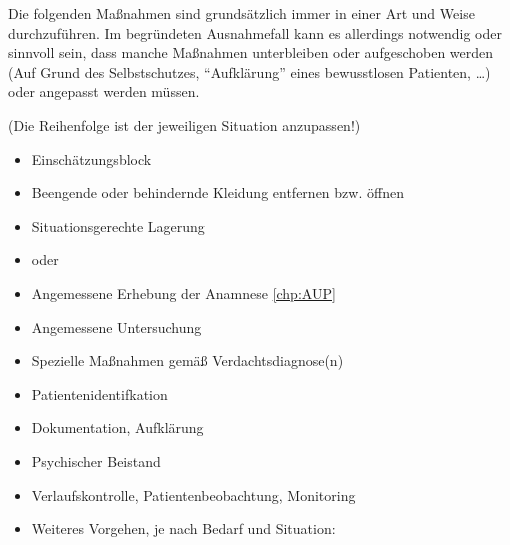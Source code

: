 \label{topic:standardmassnahmen-immer}
{\label{m:standardmassnahmen-immer}}{%
Die folgenden Maßnahmen sind grundsätzlich immer in einer  Art und Weise durchzuführen. Im begründeten Ausnahmefall kann es
allerdings notwendig oder sinnvoll sein, dass manche Maßnahmen unterbleiben oder
aufgeschoben werden (Auf Grund des Selbstschutzes, \enquote{Aufklärung} eines bewusstlosen Patienten,
\ldots{}) oder angepasst werden müssen.

{\scriptsize (Die Reihenfolge ist der jeweiligen Situation anzupassen!)}
\begin{itemize}
  \item Einschätzungsblock 
  \item Beengende oder behindernde Kleidung entfernen bzw.
  öffnen
  \item Situationsgerechte Lagerung
  \item {} oder 
  \item Angemessene Erhebung der Anamnese \ref{chp:AUP}
  \item Angemessene Untersuchung 
  \item Spezielle Maßnahmen gemäß Verdachtsdiagnose(n)
  \item Patientenidentifkation
  \item Dokumentation, Aufklärung
  \item Psychischer Beistand
  \item Verlaufskontrolle, Patientenbeobachtung, Monitoring
  \columnbreak
  \item Weiteres Vorgehen, je nach Bedarf und Situation:
  
  
 

\end{itemize}}
